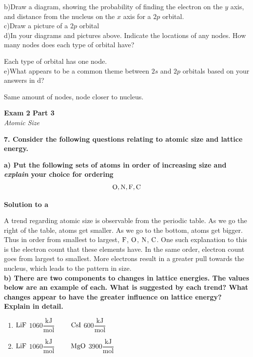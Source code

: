 \documentclass{article}
\begin{document}
    b)Draw a diagram, showing the probability of finding the electron on the $y$ axis, and distance from the nucleus on the $x$ axis for a $2p$ orbital.\\[2cm]

    c)Draw a picture of a $2p$ orbital\\[2cm]

    d)In your diagrams and pictures above. Indicate the locations of any nodes. How many nodes does each type of orbital have?

    Each type of orbital has one node.\\[2cm]

    e)What appears to be a common theme between $2s$ and $2p$ orbitals based on your answers in d?

    Same amount of nodes, node closer to nucleus.
    \pagebreak

    \begin{center}
        \textbf{Exam 2 Part 3}\\
        \textit{Atomic Size}
    \end{center}
    \textbf{7. Consider the following questions relating to atomic size and lattice energy.}

    \textbf{a) Put the following sets of atoms in order of increasing size and \textit{explain} your choice for ordering}
    $$\ce{O}, \ce{N}, \ce{F}, \ce{C}$$

    \textbf{Solution to a}

    A trend regarding atomic size is observable from the periodic table. As we go the right of the table, atoms get smaller. As we go to the bottom, atoms get bigger. Thus in order from smallest to largest, $\ce{F}$, $\ce{O}$, $\ce{N}$, $\ce{C}$.
    One such explanation to this is the electron count that these elements have. In the same order, electron count goes from largest to smallest. More electrons result in a greater pull towards the nucleus, which leads to the pattern in size.\\[1cm]

    \textbf{b) There are two components to changes in lattice energies. The values below are an example of each. What is suggested by each trend? What changes appear to have the greater influence on lattice energy? Explain in detail.}
    \begin{enumerate}
        \item $\ce{LiF}$ $1060 \dfrac{\si{\kilo\joule}}{\si{\mole}} \qquad$ $\ce{CsI}$  $600 \dfrac{\si{\kilo\joule}}{\si{\mole}}$
        \item  $\ce{LiF}$ $1060 \dfrac{\si{\kilo\joule}}{\si{\mole}} \qquad$ $\ce{MgO}$  $3900 \dfrac{\si{\kilo\joule}}{\si{\mole}}$
    \end{enumerate}
\end{document}
